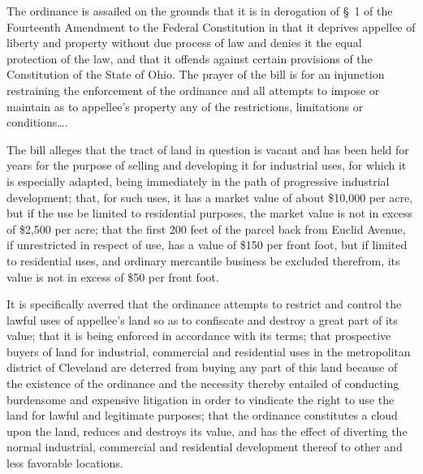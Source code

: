 The ordinance is assailed on the grounds that it is in derogation of \S~1 of the
Fourteenth Amendment to the Federal Constitution in that it deprives appellee of
liberty and property without due process of law and denies it the equal
protection of the law, and that it offends against certain provisions of the
Constitution of the State of Ohio. The prayer of the bill is for an injunction
restraining the enforcement of the ordinance and all attempts to impose or
maintain as to appellee's property any of the restrictions, limitations or
conditions\ldots .

The bill alleges that the tract of land in question is vacant and has been held
for years for the purpose of selling and developing it for industrial uses, for
which it is especially adapted, being immediately in the path of progressive
industrial development; that, for such uses, it has a market value of about
\$10,000 per acre, but if the use be limited to residential purposes, the market
value is not in excess of \$2,500 per acre; that the first 200 feet of the
parcel back from Euclid Avenue, if unrestricted in respect of use, has a value
of \$150 per front foot, but if limited to residential uses, and ordinary
mercantile business be excluded therefrom, its value is not in excess of \$50
per front foot.

It is specifically averred that the ordinance attempts to restrict and control
the lawful uses of appellee's land so as to confiscate and destroy a great part
of its value; that it is being enforced in accordance with its terms; that
prospective buyers of land for industrial, commercial and residential uses in
the metropolitan district of Cleveland are deterred from buying any part of this
land because of the existence of the ordinance and the necessity thereby
entailed of conducting burdensome and expensive litigation in order to vindicate
the right to use the land for lawful and legitimate purposes; that the ordinance
constitutes a cloud upon the land, reduces and destroys its value, and has the
effect of diverting the normal industrial, commercial and residential
development thereof to other and less favorable locations.

